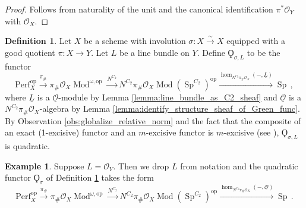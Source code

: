 \documentclass{article}
\DeclareMathOperator{\Mod}{Mod} %
\DeclareMathOperator{\Spectra}{Sp} %
\newcommand{\op}{\mathrm{op}} %
\newcommand{\perf}{\mathrm{Perf}}
\newtheorem{lemma}[equation]{Lemma}
\theoremstyle{definition}
\newtheorem{definition}[equation]{Definition}
\newtheorem{example}[equation]{Example}
\newcommand{\Lucy}[1]{\todo[color=cyan!30]{\linespread{1}\footnotesize L: #1}}
\begin{document}
\begin{proof}
    Follows from naturality of the unit and the canonical identification $ \pi^* \mathcal{O}_Y $ with $ \mathcal{O}_X $. 
\end{proof}
\begin{definition}\label{defn:quadratic_functor_from_good_quotient}
    Let $ X $ be a scheme with involution $ \sigma \colon X \xrightarrow{\sim} X $ equipped with a good quotient $ \pi \colon X \to Y $. 
    Let $ L $ be a line bundle on $ Y $. 
    Define $ \Qoppa_{\sigma, L} $ to be the functor
    \begin{equation*}
        \perf_X^\op \xrightarrow{\pi_{\#}} \pi_{\#}\mathcal{O}_X\Mod^{\omega,\op} \xrightarrow{N^{C_2}} N^{C_2}\pi_{\#}\mathcal{O}_X\Mod\left(\Spectra^{C_2}\right)^\op \xrightarrow{\hom_{N^{C_2}\pi_{\#}\mathcal{O}_X}(-,\underline{L})} \Spectra \,,
    \end{equation*}
    where $ \underline{L} $ is a $ \underline{\mathcal{O}} $-module by Lemma \ref{lemma:line_bundle_as_C2_sheaf} and $ \underline{\mathcal{O}} $ is a $ N^{C_2} \pi_{\#}\mathcal{O}_X $-algebra by Lemma \ref{lemma:identify_structure_sheaf_of_Green_func}. 
    By Observation \ref{obs:globalize_relative_norm} and the fact that the composite of an exact (1-excisive) functor and an $ m$-excisive functor is $m$-excisive (see \cite[\S2.2]{Kpoly}), $ \Qoppa_{\sigma,L} $ is quadratic. 
\end{definition}
\begin{example} 
    Suppose $ L = \mathcal{O}_Y $. 
    Then we drop $ L $ from notation and the quadratic functor $ \Qoppa_{\sigma} $ of Definition \ref{defn:quadratic_functor_from_good_quotient} takes the form
    \begin{equation*}
        \perf_X^\op \xrightarrow{\pi_{\#}} \pi_{\#}\mathcal{O}_X\Mod^{\omega,\op} \xrightarrow{N^{C_2}} N^{C_2}\pi_{\#}\mathcal{O}_X\Mod\left(\Spectra^{C_2}\right)^\op \xrightarrow{\hom_{N^{C_2}\pi_{\#}\mathcal{O}_X}(-,\underline{\mathcal{O}})} \Spectra \,.
    \end{equation*}    
\end{example}
\end{document}
